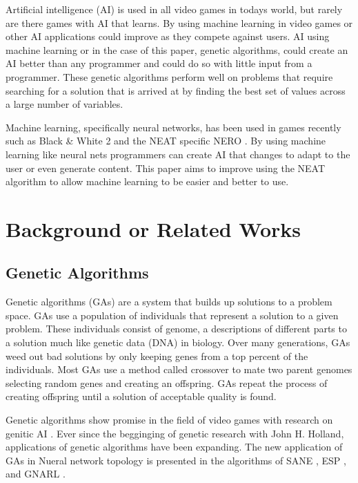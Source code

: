 \documentclass[12pt]{ucthesis} \newif\ifpdf \ifx\pdfoutput\undefined
\begin{document}
Artificial intelligence (AI) is used in all video games in todays world, but
rarely are there games with AI that learns. By using machine learning in video
games or other AI applications could improve as they compete against users. AI
using machine learning or in the case of this paper, genetic algorithms, could
create an AI better than any programmer and could do so with little input from a
programmer. These genetic algorithms perform well on problems that require
searching for a solution that is arrived at by finding the best set of values
across a large number of variables.

Machine learning, specifically neural networks, has been used in games recently
such as Black & White 2 and the NEAT specific NERO \cite{hastings2009evolving}.
By using machine learning like neural nets programmers can create AI that
changes to adapt to the user or even generate content. This paper aims to
improve using the NEAT algorithm to allow machine learning to be easier and
better to use. 
 

\chapter{Background or Related Works}


\section{Genetic Algorithms}

Genetic algorithms (GAs) are a system that builds up solutions to a problem
space. GAs use a population of individuals that represent a solution to a given
problem. These individuals consist of genome, a descriptions of different parts
to a solution much like genetic data (DNA) in biology. Over many generations,
GAs weed out bad solutions by only keeping genes from a top percent of the
individuals. Most GAs use a method called crossover to mate two parent genomes
selecting random genes and creating an offspring. GAs repeat the process of
creating offspring until a solution of acceptable quality is found.

Genetic algorithms show promise in the field of video games with research on
genitic AI \cite{Revello,PengHuo,Chih-Sheng}. Ever since the begginging of
genetic research with John H. Holland, applications of genetic algorithms have
been expanding. The new application of GAs in Nueral network topology is
presented in the algorithms of SANE \cite{moriarty:focus} , ESP
\cite{gomez:proposal} , and GNARL \cite{Angeline}.
\end{document}
